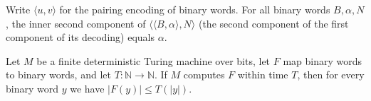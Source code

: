 \begin{theorem}
\label{Turing.NTimeDiag.dz_alpha_eq}
\leanok
{}
Write $\langle u, v\rangle$ for the pairing encoding of binary words. For all binary words $B,
\alpha, N$, the inner second component of $\langle\langle B, \alpha\rangle, N\rangle$ (the second
component of the first component of its decoding) equals $\alpha$.
\end{theorem}

\begin{theorem}
\label{Turing.NTimeDiag.dz_out_le}
\leanok
{}
Let $M$ be a finite deterministic Turing machine over bits, let $F$ map binary words to binary
words, and let $T : \mathbb{N} \to \mathbb{N}$. If $M$ computes $F$ within time $T$, then for every
binary word $y$ we have $|F(y)| \le T(|y|)$.
\end{theorem}

